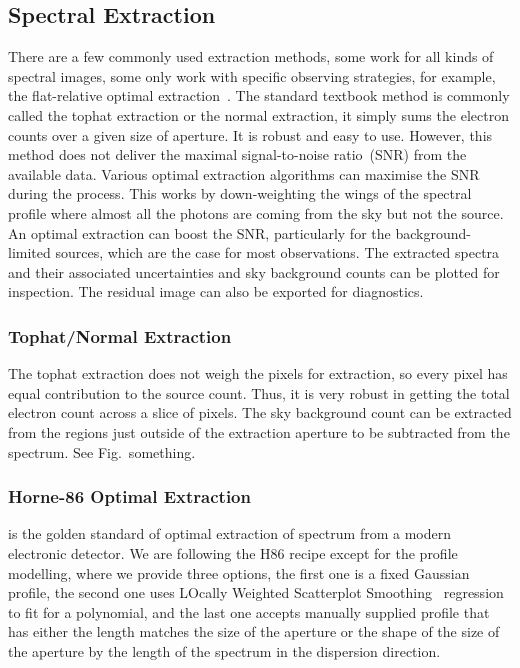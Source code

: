 \documentclass[fleqn,usenatbib]{mnras}
\begin{document}
\subsection{Spectral Extraction}
\label{sec:extract}
There are a few commonly used extraction methods, some work for
all kinds of spectral images, some only work with specific
observing strategies, for example, the flat-relative optimal
extraction~\citep{2014A&A...561A..59Z}. The standard textbook
method is commonly called the tophat extraction or the normal
extraction, it simply sums the electron counts over a given
size of aperture. It is robust and easy to use. However, this
method does not deliver the maximal signal-to-noise ratio~(SNR)
from the available data. Various optimal extraction algorithms
can maximise the SNR during the process. This works by
down-weighting the wings of the spectral profile where almost
all the photons are coming from the sky but not the source. An
optimal extraction can boost the SNR, particularly for the
background-limited sources, which are the case for most
observations. The extracted spectra and their associated
uncertainties and sky background counts can be plotted for
inspection. The residual image can also be exported for
diagnostics.

\subsubsection*{Tophat/Normal Extraction}
The tophat extraction does not weigh the pixels for extraction,
so every pixel has equal contribution to the source count. Thus,
it is very robust in getting the total electron count across
a slice of pixels. The sky background count can be extracted
from the regions just outside of the extraction aperture to be
subtracted from the spectrum. See Fig.~something.

\subsubsection*{Horne-86 Optimal Extraction}
\citet[hereafter H86]{1986PASP...98..609H} is the golden standard
of optimal extraction of spectrum from a modern electronic detector.
We are following the H86 recipe except for the profile modelling,
where we provide three options, the first one is a fixed Gaussian
profile, the second one uses LOcally Weighted Scatterplot
Smoothing~\citep[LOWESS]{doi:10.1080/01621459.1979.10481038}
regression to fit for a polynomial, and the last one accepts
manually supplied profile that has either the length matches the
size of the aperture or the shape of the size of the aperture by
the length of the spectrum in the dispersion direction.
\end{document}
